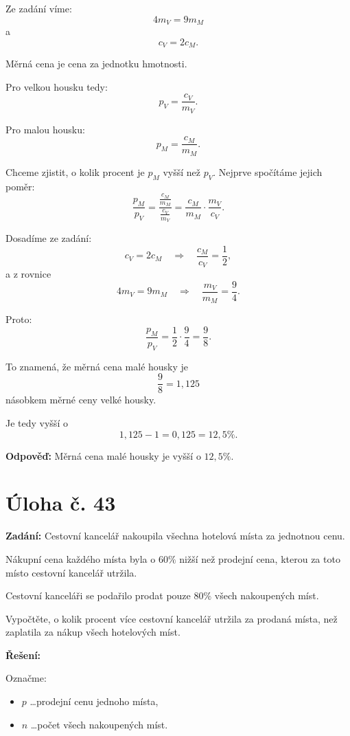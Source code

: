 \documentclass[12pt,a4paper]{article}
\begin{document}
Ze zadání víme:
\[
4m_V=9m_M
\]
a
\[
c_V=2c_M.
\]

\medskip

Měrná cena je cena za jednotku hmotnosti.

Pro velkou housku tedy:
\[
p_V=\frac{c_V}{m_V}.
\]

Pro malou housku:
\[
p_M=\frac{c_M}{m_M}.
\]

Chceme zjistit, o kolik procent je \(p_M\) vyšší než \(p_V\).  
Nejprve spočítáme jejich poměr:
\[
\frac{p_M}{p_V}
=
\frac{\frac{c_M}{m_M}}{\frac{c_V}{m_V}}
=
\frac{c_M}{m_M}\cdot\frac{m_V}{c_V}.
\]

Dosadíme ze zadání:
\[
c_V=2c_M
\quad \Rightarrow \quad
\frac{c_M}{c_V}=\frac12,
\]
a z rovnice
\[
4m_V=9m_M
\quad \Rightarrow \quad
\frac{m_V}{m_M}=\frac94.
\]

Proto:
\[
\frac{p_M}{p_V}
=
\frac12 \cdot \frac94
=
\frac98.
\]

To znamená, že měrná cena malé housky je
\[
\frac98 = 1{,}125
\]
násobkem měrné ceny velké housky.

Je tedy vyšší o
\[
1{,}125-1=0{,}125=12{,}5\%.
\]

\bigskip

\textbf{Odpověď:}  
Měrná cena malé housky je vyšší o \(12{,}5\%\).



\newpage
\section*{Úloha č. 43}

\textbf{Zadání:}  
Cestovní kancelář nakoupila všechna hotelová místa za jednotnou cenu.

Nákupní cena každého místa byla o \(60\%\) nižší než prodejní cena, kterou za toto místo cestovní kancelář utržila.

Cestovní kanceláři se podařilo prodat pouze \(80\%\) všech nakoupených míst.

Vypočtěte, o kolik procent více cestovní kancelář utržila za prodaná místa, než zaplatila za nákup všech hotelových míst.

\bigskip

\textbf{Řešení:}

Označme:
\begin{itemize}
    \item \(p\) \dots prodejní cenu jednoho místa,
    \item \(n\) \dots počet všech nakoupených míst.
\end{itemize}
\end{document}
